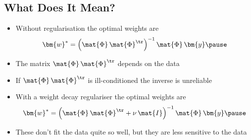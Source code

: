 
\begin{slide}
\section[-1]{What Does It Mean?}

\begin{PauseHighLight}
  \begin{itemize}
  \item Without regularisation the optimal weights are
    \begin{align*}
      \bm{w}^* = \left( \mat{\Phi} \, \mat{\Phi}^\tr \right)^{-1}
      \mat{\Phi} \, \bm{y} \pause
    \end{align*}
  \item The matrix $\mat{\Phi} \, \mat{\Phi}^\tr$ depends on the
    data\pause
  \item If $\mat{\Phi} \, \mat{\Phi}^\tr$ is ill-conditioned the inverse
    is unreliable\pause
  \item With a weight decay regulariser the optimal weights are
    \begin{displaymath}
      \bm{w}^{*} = \left( \strut \mat{\Phi}\, \mat{\Phi}^\tr + \nu\, \mat{I}
      \right)^{-1} \mat{\Phi}\, \bm{y}\pause
    \end{displaymath}
  \item These don't fit the data quite so well, but they are less
    sensitive to the data\pause
  \end{itemize}
\end{PauseHighLight}

\end{slide}



